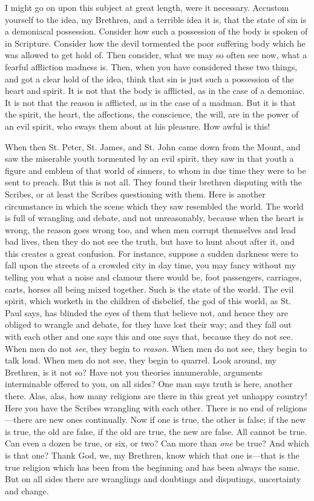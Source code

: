 I might go on upon this subject at great length,
were it necessary. Accustom yourself to the idea, my Brethren, and a
terrible idea it is, that the state of sin is a demoniacal possession.
Consider how such a possession of the body is spoken of in Scripture.
Consider how the devil tormented the poor suffering body which he was
allowed to get hold of. Then consider, what we may so often see
now, what a fearful affliction madness is. Then, when you have
considered these two things, and got a clear hold of the idea, think
that sin is just such a possession of the heart and spirit. It is not
that the body is afflicted, as in the case of a demoniac. It is not
that the reason is afflicted, as in the case of a madman. But it is
that the spirit, the heart, the affections, the conscience, the will,
are in the power of an evil spirit, who sways them about at his
pleasure. How awful is this!

When then St. Peter, St. James, and St. John came
down from the Mount, and saw the miserable youth tormented by an evil
spirit, they saw in that youth a figure and emblem of that world of
sinners, to whom in due time they were to be sent to preach. But this
is not all. They found their brethren disputing with the Scribes, or
at least the Scribes questioning with them. Here is another
circumstance in which the scene which they saw resembled the world.
The world is full of wrangling and debate, and not unreasonably,
because when the heart is wrong, the reason goes wrong too, and when
men corrupt themselves and lead bad lives, then they do not see the
truth, but have to hunt about after it, and this creates a great
confusion. For instance, suppose a sudden darkness were to fall upon
the streets of a crowded city in day time, you may fancy without my
telling you what a noise and clamour there would be, foot passengers,
carriages, carts, horses all being mixed together. Such is the
state of the world. The evil spirit, which worketh in the children of
disbelief, the god of this world, as St. Paul says, has blinded the
eyes of them that believe not, and hence they are obliged to wrangle
and debate, for they have lost their way; and they fall out with each
other and one says this and one says that, because they do not see.
When men do not \emph{see}, they begin to \emph{reason}. When men do
not see, they begin to talk loud. When men do not see, they begin to
quarrel. Look around, my Brethren, is it not so? Have not you theories
innumerable, arguments interminable offered to you, on all sides? One
man says truth is here, another there. Alas, alas, how many religions
are there in this great yet unhappy country! Here you have the Scribes
wrangling with each other. There is no end of religions—there are
new ones continually. Now if one is true, the other is false; if the
new is true, the old are false, if the old are true, the new are
false. All cannot be true. Can even a dozen be true, or six, or two?
Can more than \emph{one} be true? And which is that one? Thank God,
we, my Brethren, know which that one is—that is the true religion
which has been from the beginning and has been always the same. But on
all sides there are wranglings and doubtings and disputings,
uncertainty and change.


